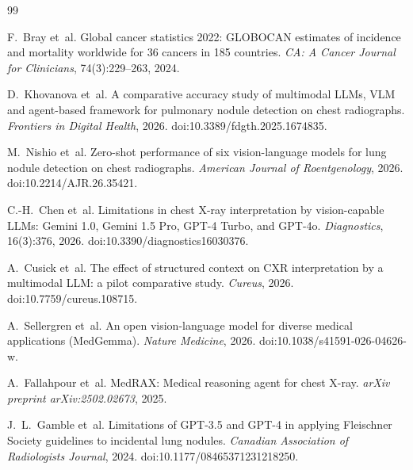 \clearpage
{}
{}
{\footnotesize
\begin{thebibliography}{99}\setlength{\itemsep}{1pt}\setlength{\parskip}{0pt}

F.~Bray et~al.
\newblock Global cancer statistics 2022: GLOBOCAN estimates of incidence and mortality worldwide for 36 cancers in 185 countries.
\newblock \emph{CA: A Cancer Journal for Clinicians}, 74(3):229--263, 2024.

D.~Khovanova et~al.
\newblock A comparative accuracy study of multimodal LLMs, VLM and agent-based framework for pulmonary nodule detection on chest radiographs.
\newblock \emph{Frontiers in Digital Health}, 2026. doi:10.3389/fdgth.2025.1674835.

M.~Nishio et~al.
\newblock Zero-shot performance of six vision-language models for lung nodule detection on chest radiographs.
\newblock \emph{American Journal of Roentgenology}, 2026. doi:10.2214/AJR.26.35421.

C.-H.~Chen et~al.
\newblock Limitations in chest X-ray interpretation by vision-capable LLMs: Gemini 1.0, Gemini 1.5 Pro, GPT-4 Turbo, and GPT-4o.
\newblock \emph{Diagnostics}, 16(3):376, 2026. doi:10.3390/diagnostics16030376.

A.~Cusick et~al.
\newblock The effect of structured context on CXR interpretation by a multimodal LLM: a pilot comparative study.
\newblock \emph{Cureus}, 2026. doi:10.7759/cureus.108715.

A.~Sellergren et~al.
\newblock An open vision-language model for diverse medical applications (MedGemma).
\newblock \emph{Nature Medicine}, 2026. doi:10.1038/s41591-026-04626-w.

A.~Fallahpour et~al.
\newblock MedRAX: Medical reasoning agent for chest X-ray.
\newblock \emph{arXiv preprint arXiv:2502.02673}, 2025.

J.~L.~Gamble et~al.
\newblock Limitations of GPT-3.5 and GPT-4 in applying Fleischner Society guidelines to incidental lung nodules.
\newblock \emph{Canadian Association of Radiologists Journal}, 2024. doi:10.1177/08465371231218250.


\end{thebibliography}}
